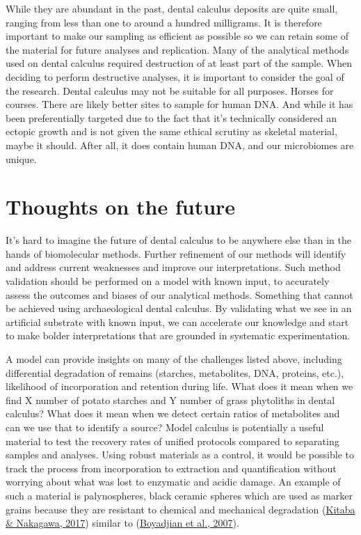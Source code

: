 \documentclass[
  letterpaper,
]{book}
\begin{document}
While they are abundant in the past, dental calculus deposits are quite
small, ranging from less than one to around a hundred milligrams. It is
therefore important to make our sampling as efficient as possible so we
can retain some of the material for future analyses and replication.
Many of the analytical methods used on dental calculus required
destruction of at least part of the sample. When deciding to perform
destructive analyses, it is important to consider the goal of the
research. Dental calculus may not be suitable for all purposes. Horses
for courses. There are likely better sites to sample for human DNA. And
while it has been preferentially targeted due to the fact that it's
technically considered an ectopic growth and is not given the same
ethical scrutiny as skeletal material, maybe it should. After all, it
does contain human DNA, and our microbiomes are unique.

\hypertarget{thoughts-on-the-future}{%
\section{Thoughts on the future}\label{thoughts-on-the-future}}

It's hard to imagine the future of dental calculus to be anywhere else
than in the hands of biomolecular methods. Further refinement of our
methods will identify and address current weaknesses and improve our
interpretations. Such method validation should be performed on a model
with known input, to accurately assess the outcomes and biases of our
analytical methods. Something that cannot be achieved using
archaeological dental calculus. By validating what we see in an
artificial substrate with known input, we can accelerate our knowledge
and start to make bolder interpretations that are grounded in systematic
experimentation.

A model can provide insights on many of the challenges listed above,
including differential degradation of remains (starches, metabolites,
DNA, proteins, etc.), likelihood of incorporation and retention during
life. What does it mean when we find X number of potato starches and Y
number of grass phytoliths in dental calculus? What does it mean when we
detect certain ratios of metabolites and can we use that to identify a
source? Model calculus is potentially a useful material to test the
recovery rates of unified protocols compared to separating samples and
analyses. Using robust materials as a control, it would be possible to
track the process from incorporation to extraction and quantification
without worrying about what was lost to enzymatic and acidic damage. An
example of such a material is palynospheres, black ceramic spheres which
are used as marker grains because they are resistant to chemical and
mechanical degradation
(\protect\hyperlink{ref-kitabaBlackCeramic2017}{Kitaba \& Nakagawa,
2017}) similar to
(\protect\hyperlink{ref-boyadjianDentalWash2007}{Boyadjian et al.,
2007}).
\end{document}
